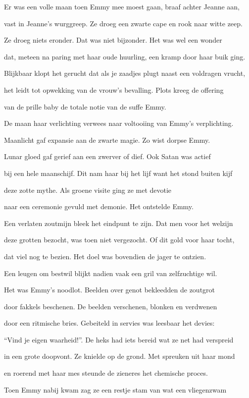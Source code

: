 Er was een volle maan
toen Emmy mee moest gaan,
braaf achter Jeanne aan,

vast in Jeanne’s wurggreep.
Ze droeg een zwarte cape
en rook naar witte zeep.

Ze droeg niets eronder.
Dat was niet bijzonder.
Het was wel een wonder

dat, meteen na paring
met haar oude huurling,
een kramp door haar buik ging.

Blijkbaar klopt het gerucht
dat als je zaadjes plugt
naast een voldragen vrucht,

het leidt tot opwekking
van de vrouw’s bevalling.
Plots kreeg de offering

van de prille baby
de totale notie
van de suffe Emmy.

De maan haar verlichting
verwees naar voltooiing
van Emmy’s verplichting.

Maanlicht gaf expansie
aan de zwarte magie.
Zo wist dorpse Emmy.

Lunar gloed gaf gerief
aan een zwerver of dief.
Ook Satan was actief

bij een hele maanschijf.
Dit nam haar bij het lijf
want het stond buiten kijf

deze zotte mythe.
Als groene visite
ging ze met devotie

naar een ceremonie
gevuld met demonie.
Het ontstelde Emmy.

Een verlaten zoutmijn
bleek het eindpunt te zijn.
Dat men voor het welzijn

deze grotten bezocht,
was toen niet vergezocht.
Of dit gold voor haar tocht,

dat viel nog te bezien.
Het doel was bovendien
de jager te ontzien.

Een leugen om bestwil
blijkt nadien vaak een gril
van zelfzuchtige wil.

Het was Emmy’s noodlot.
Beelden over genot
bekleedden de zoutgrot

door fakkels beschenen.
De beelden verschenen,
blonken en verdwenen

door een ritmische bries.
Gebeiteld in servies
was leesbaar het devies:

“Vind je eigen waarheid!”.
De heks had iets bereid
wat ze net had verspreid

in een grote doopvont.
Ze knielde op de grond.
Met spreuken uit haar mond

en roerend met haar mes
steunde de zieneres
het chemische proces.

Toen Emmy nabij kwam
zag ze een restje stam
van wat een vliegenzwam

